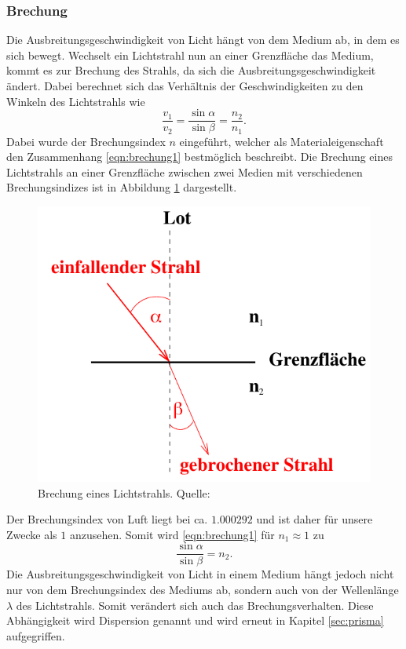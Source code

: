 \subsubsection*{Brechung}
\label{sec:brechung}
Die Ausbreitungsgeschwindigkeit von Licht hängt von dem Medium ab, in dem es sich bewegt. Wechselt ein Lichtstrahl
nun an einer Grenzfläche das Medium, kommt es zur Brechung des Strahls, da sich die Ausbreitungsgeschwindigkeit
ändert. Dabei berechnet sich das Verhältnis der Geschwindigkeiten zu den Winkeln des Lichtstrahls wie
\begin{equation}
    \frac{v_1}{v_2}=\frac{\sin\alpha}{\sin\beta}=\frac{n_2}{n_1}.
    \label{eqn:brechung1}
\end{equation}
Dabei wurde der Brechungsindex $n$ eingeführt, welcher als Materialeigenschaft den Zusammenhang \ref{eqn:brechung1}
bestmöglich beschreibt. Die Brechung eines Lichtstrahls an einer Grenzfläche zwischen zwei Medien mit verschiedenen
Brechungsindizes ist in Abbildung \ref{fig:brechung} dargestellt.
\begin{figure}[H]
    \centering
    \includegraphics[scale = 0.5]{pictures/Brechung.png}
    \caption{Brechung eines Lichtstrahls. Quelle: \cite{AP01}}
    \label{fig:brechung}
\end{figure}
\noindent
Der Brechungsindex von Luft liegt bei ca. $\num{1.000292}$ \cite{AP01} und ist daher für unsere Zwecke als $1$
anzusehen. Somit wird \eqref{eqn:brechung1} für $n_1\approx1$ zu
\begin{equation}
    \frac{\sin\alpha}{\sin\beta}=n_2.
    \label{eqn:brechung2}
\end{equation}
Die Ausbreitungsgeschwindigkeit von Licht in einem Medium hängt jedoch nicht nur von dem Brechungsindex des Mediums
ab, sondern auch von der Wellenlänge $\lambda$ des Lichtstrahls. Somit verändert sich auch das Brechungsverhalten.
Diese Abhängigkeit wird Dispersion genannt und wird erneut in Kapitel \ref{sec:prisma} aufgegriffen.

